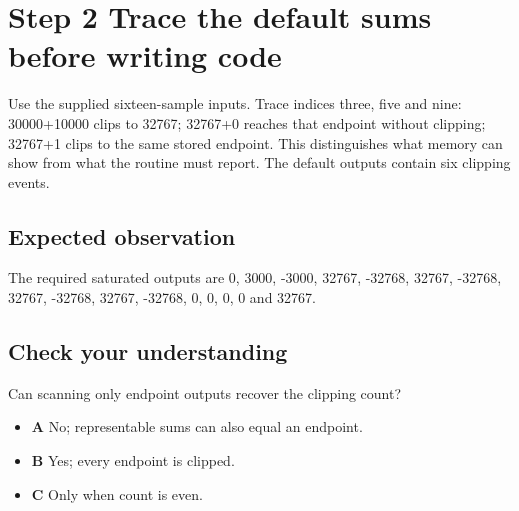 \section{Step 2 Trace the default sums before writing code}\label{pcm-s02}

Use the supplied sixteen-sample inputs. Trace indices three, five and nine: 30000+10000 clips to 32767; 32767+0 reaches that endpoint without clipping; 32767+1 clips to the same stored endpoint. This distinguishes what memory can show from what the routine must report. The default outputs contain six clipping events.

\subsection{Expected observation}
The required saturated outputs are 0, 3000, -3000, 32767, -32768, 32767, -32768, 32767, -32768, 32767, -32768, 0, 0, 0, 0 and 32767.

\subsection{Check your understanding}
Can scanning only endpoint outputs recover the clipping count?

\begin{itemize}
  \item \textbf{A} No; representable sums can also equal an endpoint.
  \item \textbf{B} Yes; every endpoint is clipped.
  \item \textbf{C} Only when count is even.
\end{itemize}
